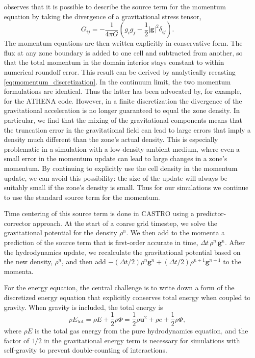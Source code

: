 \documentclass[iop]{../emulateapj}
\begin{document}
\citet[Chapter 4]{shu:1992} observes that it is possible to describe the source term 
for the momentum equation by taking the divergence of a gravitational stress tensor,
\begin{equation}
  G_{ij} = -\frac{1}{4\pi G}\left(g_i g_j - \frac{1}{2}|\mathbf{g}|^2\delta_{ij}\right).
\end{equation}
The momentum equations are then written explicitly in conservative form.
The flux at any zone boundary is added to one cell and
subtracted from another, so that the total momentum in the domain interior stays constant to
within numerical roundoff error. This result can be derived by analytically recasting 
\autoref{eq:momentum_discretization}. In the continuum limit, the two momentum
formulations are identical. Thus the latter has been advocated by, for example, 
\cite{jiang:2013} for the ATHENA code. However, in a finite discretization 
the divergence of the gravitational acceleration is no longer guaranteed to equal
the zone density. In particular, we find that the mixing of the gravitational components
means that the truncation error in the gravitational field can lead to large errors
that imply a density much different than the zone's actual density. This is especially
problematic in a simulation with a low-density ambient medium, where even a small error 
in the momentum update can lead to large changes in a zone's momentum. By continuing to explicitly
use the cell density in the momentum update, we can avoid this possibility: the size of the update
will always be suitably small if the zone's density is small. Thus for our simulations
we continue to use the standard source term for the momentum.

Time centering of this source term is done in CASTRO using a predictor-corrector approach.
At the start of a coarse grid timestep, we solve the gravitational potential for the density $\rho^n$.
We then add to the momenta a prediction of the source term that is first-order accurate in time, 
$\Delta t\, \rho^n\, \mathbf{g}^n$. After the hydrodynamics update, we recalculate
the gravitational potential based on the new density, $\rho^n$, and then add 
$-(\Delta t/2) \rho^n \mathbf{g}^n + (\Delta t/2) \rho^{n+1} \mathbf{g}^{n+1}$ to the momenta.

For the energy equation, the central challenge is to write down a form of the 
discretized energy equation that explicitly conserves total energy when 
coupled to gravity. When gravity is included, the total energy is
\begin{equation}
  \rho E_{\text{tot}} = \rho E + \frac{1}{2}\rho\Phi = \frac{1}{2}\rho \mathbf{u}^2 + \rho e + \frac{1}{2}\rho\Phi, \label{eq:total_energy_gravity}
\end{equation}
where $\rho E$ is the total gas energy from the pure hydrodynamics equation,
and the factor of $1/2$ in the gravitational energy term is necessary
for simulations with self-gravity to prevent double-counting of
interactions.
\end{document}
